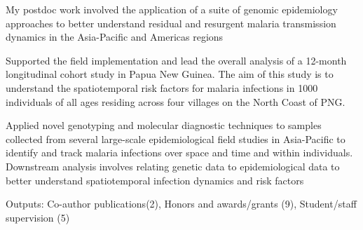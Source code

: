 \documentclass[11pt,a4paper,]{awesome-cv}
\begin{document}
\begin{cventries}
{\begin{cvitems}
\item My postdoc work involved the application of a suite of genomic epidemiology approaches to better understand residual and resurgent malaria transmission dynamics in the Asia-Pacific and Americas regions
\item Supported the field implementation and lead the overall analysis of a 12-month longitudinal cohort study in Papua New Guinea. The aim of this study is to understand the spatiotemporal risk factors for malaria infections in 1000 individuals of all ages residing across four villages on the North Coast of PNG.
\item Applied novel genotyping and molecular diagnostic techniques to samples collected from several large-scale epidemiological field studies in Asia-Pacific to identify and track malaria infections over space and time and within individuals. Downstream analysis involves relating genetic data to epidemiological data to better understand spatiotemporal infection dynamics and risk factors
\item Outputs: Co-author publications(2), Honors and awards/grants (9), Student/staff supervision (5)
\end{cvitems}}
\end{cventries}
\end{document}
